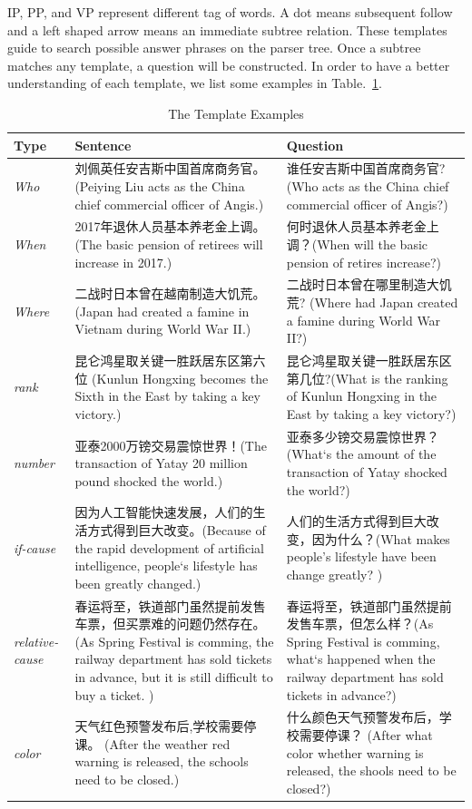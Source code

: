\documentclass[runningheads,UTF8,article]{comsis2}
\newcommand\revised[1]{{\color{red} #1}}
\begin{document}
	IP, PP, and VP represent different tag of words. A dot means subsequent follow and a left shaped arrow means an immediate subtree relation. These templates guide to search possible answer phrases on the parser tree. Once a subtree matches any template, a question will be constructed.
	\revised{
	In order to have a better understanding of each template, we list some examples in Table.~\ref{example}.}
	
	
	\begin{table}[!ht]
		\centering
		\caption{The Template Examples}
		\setlength\tabcolsep{0.5em}
		\label{example}
		\begin{tabular}{|p{25pt}|p{155pt} | p{150pt} |}
			\hline
			Type& Sentence & Question \\
			\hline
			\emph{Who} & 刘佩英任安吉斯中国首席商务官。(Peiying Liu acts as the China chief commercial officer of Angis.) & 谁任安吉斯中国首席商务官?(Who acts as the China chief commercial officer of Angis?)\\
			\hline
			\emph{When} & 2017年退休人员基本养老金上调。(The basic pension of retirees will increase in 2017.) & 何时退休人员基本养老金上调？(When will the basic pension of retires increase?)  \\
			\hline
			\emph{Where} & 二战时日本曾在越南制造大饥荒。(Japan had created a famine in Vietnam during World War II.)& 二战时日本曾在哪里制造大饥荒?	(Where had Japan created a famine during World War II?) \\
			\hline
			\emph{rank}& 昆仑鸿星取关键一胜跃居东区第六位 (Kunlun Hongxing becomes the Sixth in the East by taking a key victory.)& 昆仑鸿星取关键一胜跃居东区第几位?(What is the ranking of Kunlun Hongxing in the East by taking a key victory?)\\
			\hline
			\emph{number}& 亚泰2000万镑交易震惊世界！(The transaction of Yatay 20 million pound shocked the world.)& 亚泰多少镑交易震惊世界？(What`s the amount of the transaction of Yatay shocked the world?) \\
			\hline
			\emph{if-cause}& 因为人工智能快速发展，人们的生活方式得到巨大改变。(Because of the rapid development of artificial intelligence, people`s lifestyle has been greatly changed.)&	人们的生活方式得到巨大改变，因为什么？(What makes people's lifestyle have been change greatly? )\\
			\hline
			\emph{relative-cause}& 春运将至，铁道部门虽然提前发售车票，但买票难的问题仍然存在。	(As Spring Festival is comming, the railway department has sold tickets in advance, but it is still difficult to buy a ticket. )&春运将至，铁道部门虽然提前发售车票，但怎么样？(As Spring Festival is comming, what`s happened when the railway department has sold tickets in advance?)\\
			
			\hline
			\emph{color} & 天气红色预警发布后,学校需要停课。 (After the weather red warning is released, the schools need to be closed.) &   什么颜色天气预警发布后，学校需要停课？ (After what color whether warning is released, the shools need to be closed?) \\ 
			\hline
		\end{tabular}
	\end{table}	
	
\end{document}
